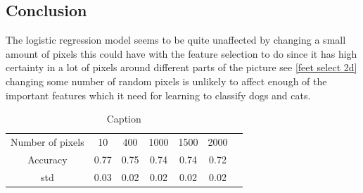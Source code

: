 \documentclass{article}
\begin{document}
\subsection{Conclusion}
The logistic regression model seems to be quite unaffected by changing a small amount of pixels this could have with the feature selection to do since it has high certainty in a lot of pixels around different parts of the picture see \ref{feet select 2d} changing some number of random pixels is unlikely to affect enough of the important features which it need for learning to classify dogs and cats. 
\begin{table}[H]
    \centering
    \begin{tabular}{c|c|c|c|c|c|c}
        Number of pixels & 10 &  400  & 1000 & 1500 &2000  \\
        Accuracy & 0.77 & 0.75 & 0.74 & 0.74 & 0.72\\
        std & 0.03 & 0.02& 0.02 & 0.02 & 0.02\\
        
    \end{tabular}
    \caption{Caption}
    \label{pixel accuracy}
\end{table}
\end{document}
